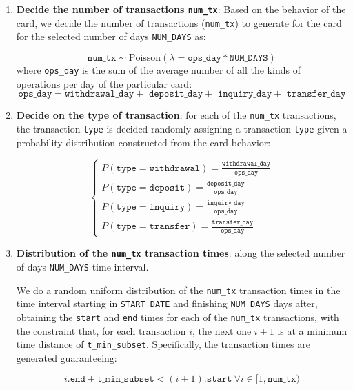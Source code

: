\documentclass{article}
\begin{document}
\begin{enumerate}
    \item \textbf{Decide the number of transactions \texttt{num\_tx}}:
    Based on the behavior of the card, we decide the number of transactions (\texttt{num\_tx}) to generate for the card for the selected number of days \texttt{NUM\_DAYS} as:

    $$\texttt{num\_tx} \sim \text{Poisson}(\lambda = \texttt{ops\_day} * \texttt{NUM\_DAYS})$$ where \texttt{ops\_day} is the sum of the average number of all the kinds of operations per day of the particular card: 
    $$\texttt{ops\_day} = \texttt{withdrawal\_day} + \texttt{ deposit\_day} + \texttt{ inquiry\_day} + \texttt{ transfer\_day}$$


    \item \textbf{Decide on the type of transaction}: for each of the \texttt{num\_tx} transactions, the transaction \texttt{type} is decided randomly assigning a transaction \texttt{type} given a probability distribution constructed from the card behavior:
    
    $$
    \begin{cases}
      P(\texttt{type} =  \texttt{withdrawal}) = \frac{\texttt{withdrawal\_day}}{\texttt{ops\_day}} \\[8pt]
      P(\texttt{type} =  \texttt{deposit}) = \frac{\texttt{deposit\_day}}{\texttt{ops\_day}} \\[8pt]
      P(\texttt{type} = \texttt{inquiry}) = \frac{\texttt{inquiry\_day}}{\texttt{ops\_day}} \\[8pt]
      P(\texttt{type} =  \texttt{transfer}) = \frac{\texttt{transfer\_day}}{\texttt{ops\_day}} 
    \end{cases}
    $$

    \item \textbf{Distribution of the \texttt{num\_tx} transaction times}: along the selected number of days \texttt{NUM\_DAYS} time interval.
    
    We do a random uniform distribution of the \texttt{num\_tx} transaction times
    in the time interval starting in \texttt{START\_DATE} and finishing \texttt{NUM\_DAYS} days after, obtaining the \texttt{start} and \texttt{end} times for each of the \texttt{num\_tx} transactions, with the constraint that, for each transaction $i$, the next one $i+1$ is at a minimum time distance of \texttt{t\_min\_subset}. Specifically, the transaction times are generated guaranteeing:

    $$i.\texttt{end} + \texttt{t\_min\_subset} < (i+1).\texttt{start} \ \forall i \in [1,\texttt{num\_tx})$$


\end{enumerate}
\end{document}
